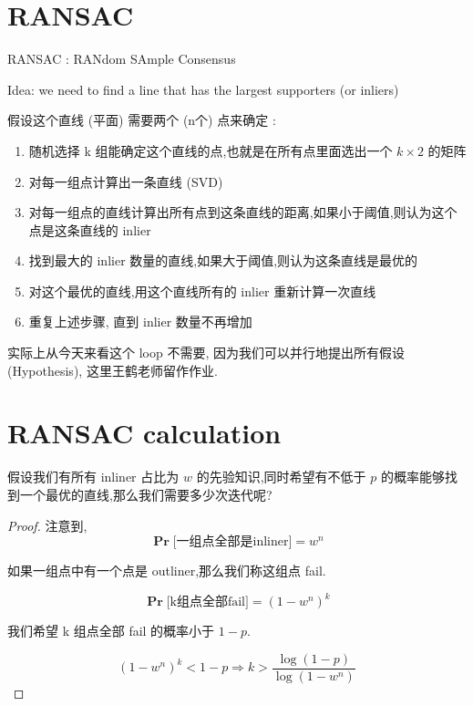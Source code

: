 \newpage
\section{RANSAC}


RANSAC : RANdom SAmple Consensus

Idea: we need to ﬁnd a line that has the largest supporters (or inliers)

\begin{definition}
    假设这个直线 (平面) 需要两个 (n个) 点来确定 : 

    \begin{enumerate}
        \item 随机选择 k 组能确定这个直线的点,也就是在所有点里面选出一个 $k\times 2$ 的矩阵
        \item 对每一组点计算出一条直线 (SVD)
        \item 对每一组点的直线计算出所有点到这条直线的距离,如果小于阈值,则认为这个点是这条直线的 inlier
        \item 找到最大的 inlier 数量的直线,如果大于阈值,则认为这条直线是最优的
        \item 对这个最优的直线,用这个直线所有的 inlier 重新计算一次直线
        \item 重复上述步骤, 直到 inlier 数量不再增加
    \end{enumerate}
    
\end{definition}
\begin{note}
    实际上从今天来看这个 loop 不需要, 因为我们可以并行地提出所有假设 (Hypothesis), 这里王鹤老师留作作业.
\end{note}

\section{RANSAC calculation}
\begin{problem}
假设我们有所有 inliner 占比为 $w$ 的先验知识,同时希望有不低于 $p$ 的概率能够找到一个最优的直线,那么我们需要多少次迭代呢?
\end{problem}
\begin{proof}
注意到, 
\begin{equation}
\mathbf{\Pr}\text{[一组点全部是inliner]} = w^n
\end{equation}

如果一组点中有一个点是 outliner,那么我们称这组点 fail.

\begin{equation}
\mathbf{\Pr}\text{[k组点全部fail]} = {(1-w^n)}^k
\end{equation}

我们希望 k 组点全部 fail 的概率小于 $1-p$.

\begin{equation}
{(1-w^{n})}^k < 1-p
\Rightarrow
k > \frac{\log(1-p)}{\log(1-w^n)}
\end{equation}
\end{proof}

